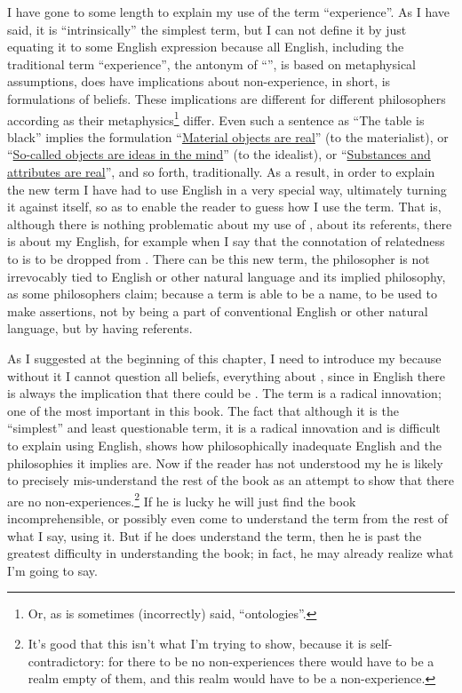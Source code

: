 I have gone to some length to explain my use of the term \enquote{experience}. 
As I have said, it is \enquote{intrinsically} the simplest term, but I can not define it 
by just equating it to some English expression because all English, including 
the traditional term \enquote{experience}, the antonym of \enquote{}, is based 
on metaphysical assumptions, does have implications about non-experience, 
in short, is formulations of beliefs. These implications are different for 
different philosophers according as their metaphysics\footnote{Or, as is sometimes 
(incorrectly) said, \enquote{ontologies}.} differ. Even such a sentence as \enquote{The table is 
black} implies the formulation \enquote{\uline{Material objects are real}} (to the materialist), 
or \enquote{\uline{So-called objects are ideas in the mind}} (to the idealist), or 
\enquote{\uline{Substances 
and attributes are real}}, and so forth, traditionally. As a result, in order to 
explain the new term I have had to use English in a very special way, 
ultimately turning it against itself, so as to enable the reader to guess how I 
use the term. That is, although there is nothing problematic about my use of 
, about its referents, there is about my English, for example 
when I say that the connotation of relatedness to  is to be 
dropped from . There can be this new term, the philosopher is 
not irrevocably tied to English or other natural language and its implied 
philosophy, as some philosophers claim; because a term is able to be a name, 
to be used to make assertions, not by being a part of conventional English or 
other natural language, but by having referents. 

As I suggested at the beginning of this chapter, I need to introduce my 
 because without it I cannot question all beliefs, everything 
about , since in English there is always the implication that 
there could be . The term is a radical innovation; one of the 
most important in this book. The fact that although it is the \enquote{simplest} and 
least questionable term, it is a radical innovation and is difficult to explain 
using English, shows how philosophically inadequate English and the 
philosophies it implies are. Now if the reader has not understood my 
 he is likely to precisely mis-understand the rest of the book as 
an attempt to show that there are no non-experiences.\footnote{It's good that this 
isn't what I'm trying to show, because it is self-contradictory: for there to be 
no non-experiences there would have to be a realm empty of them, and this 
realm would have to be a non-experience.} If he is lucky he will just find the 
book incomprehensible, or possibly even come to understand the term from 
the rest of what I say, using it. But if he does understand the term, then he is 
past the greatest difficulty in understanding the book; in fact, he may 
already realize what I'm going to say. 


